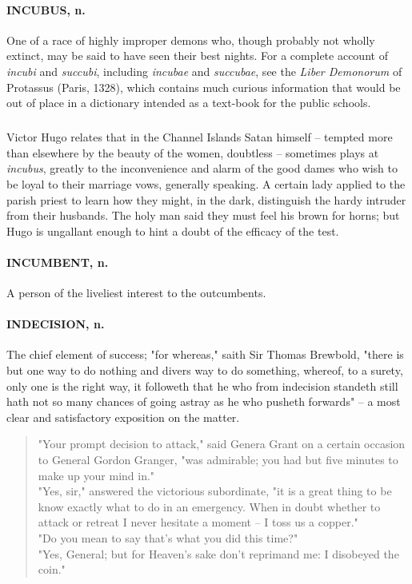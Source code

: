 \documentclass[11pt]{article}
\begin{document}
\paragraph{INCUBUS, n.}  One of a race of highly improper demons who, though
probably not wholly extinct, may be said to have seen their best
nights.  For a complete account of {\em incubi} and {\em succubi}, including
{\em incubae} and {\em succubae}, see the {\em Liber Demonorum} of Protassus
(Paris, 1328), which contains much curious information that would be
out of place in a dictionary intended as a text-book for the public
schools.
\subparagraph{}   Victor Hugo relates that in the Channel Islands Satan himself --
tempted more than elsewhere by the beauty of the women, doubtless --
sometimes plays at {\em incubus}, greatly to the inconvenience and alarm
of the good dames who wish to be loyal to their marriage vows,
generally speaking.  A certain lady applied to the parish priest to
learn how they might, in the dark, distinguish the hardy intruder from
their husbands.  The holy man said they must feel his brown for horns;
but Hugo is ungallant enough to hint a doubt of the efficacy of the
test.

\paragraph{INCUMBENT, n.}  A person of the liveliest interest to the outcumbents.

\paragraph{INDECISION, n.}  The chief element of success; "for whereas," saith Sir
Thomas Brewbold, "there is but one way to do nothing and divers way to
do something, whereof, to a surety, only one is the right way, it
followeth that he who from indecision standeth still hath not so many
chances of going astray as he who pusheth forwards" -- a most clear
and satisfactory exposition on the matter.
\begin{quote}   "Your prompt decision to attack," said Genera Grant on a certain
occasion to General Gordon Granger, "was admirable; you had but five
minutes to make up your mind in." \\
    "Yes, sir," answered the victorious subordinate, "it is a great 
thing to be know exactly what to do in an emergency.  When in doubt
whether to attack or retreat I never hesitate a moment -- I toss us a
copper." \\
     "Do you mean to say that's what you did this time?" \\
  "Yes, General; but for Heaven's sake don't reprimand me:  I
disobeyed the coin."
\end{quote}
\end{document}
